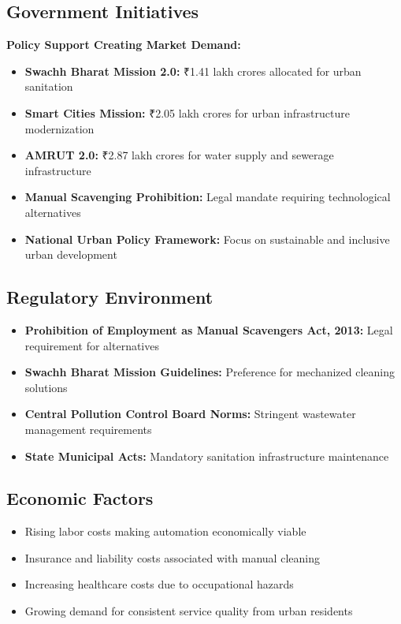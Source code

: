 \documentclass[11pt,a4paper]{article}
\begin{document}
\subsection{Government Initiatives}
\begin{success}
\textbf{Policy Support Creating Market Demand:}
\begin{itemize}
    \item \textbf{Swachh Bharat Mission 2.0:} ₹1.41 lakh crores allocated for urban sanitation
    \item \textbf{Smart Cities Mission:} ₹2.05 lakh crores for urban infrastructure modernization
    \item \textbf{AMRUT 2.0:} ₹2.87 lakh crores for water supply and sewerage infrastructure
    \item \textbf{Manual Scavenging Prohibition:} Legal mandate requiring technological alternatives
    \item \textbf{National Urban Policy Framework:} Focus on sustainable and inclusive urban development
\end{itemize}
\end{success}

\subsection{Regulatory Environment}
\begin{itemize}[leftmargin=2em]
    \item \textbf{Prohibition of Employment as Manual Scavengers Act, 2013:} Legal requirement for alternatives
    \item \textbf{Swachh Bharat Mission Guidelines:} Preference for mechanized cleaning solutions
    \item \textbf{Central Pollution Control Board Norms:} Stringent wastewater management requirements
    \item \textbf{State Municipal Acts:} Mandatory sanitation infrastructure maintenance
\end{itemize}

\subsection{Economic Factors}
\begin{itemize}[leftmargin=2em]
    \item Rising labor costs making automation economically viable
    \item Insurance and liability costs associated with manual cleaning
    \item Increasing healthcare costs due to occupational hazards
    \item Growing demand for consistent service quality from urban residents
\end{itemize}
\end{document}
